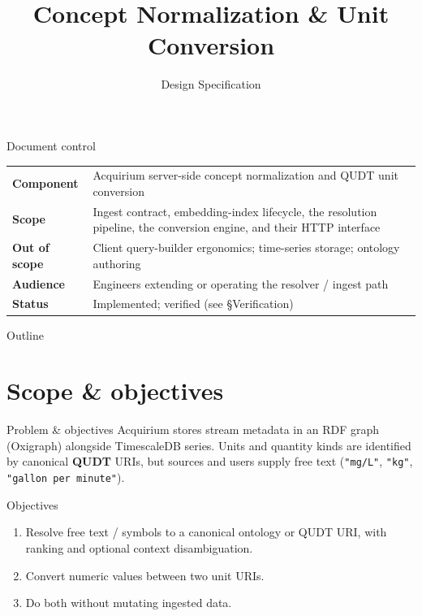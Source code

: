 \documentclass[aspectratio=169]{beamer}
\title[QUDT Normalization]{Concept Normalization \& Unit Conversion}
\subtitle{Design Specification}
\date{}
\newcommand{\code}[1]{\texttt{\small #1}}
\begin{document}
\frame{\titlepage}

\begin{frame}{Document control}
  \small
  \begin{tabular}{@{}p{}p{}@{}}
    \hline
    \textbf{Component} & Acquirium server-side concept normalization and
        QUDT unit conversion \\
    \textbf{Scope} & Ingest contract, embedding-index lifecycle, the
        resolution pipeline, the conversion engine, and their HTTP
        interface \\
    \textbf{Out of scope} & Client query-builder ergonomics; time-series
        storage; ontology authoring \\
    \textbf{Audience} & Engineers extending or operating the resolver /
        ingest path \\
    \textbf{Status} & Implemented; verified (see \S Verification) \\ \hline
  \end{tabular}
\end{frame}

\begin{frame}{Outline}
  \tableofcontents
\end{frame}

\section{Scope \& objectives}

\begin{frame}{Problem \& objectives}
  Acquirium stores stream metadata in an RDF graph (Oxigraph) alongside
  TimescaleDB series. Units and quantity kinds are identified by canonical
  \textbf{QUDT} URIs, but sources and users supply free text
  (\code{"mg/L"}, \code{"kg"}, \code{"gallon per minute"}).

  \begin{block}{Objectives}
    \begin{enumerate}
      \item Resolve free text / symbols to a canonical ontology or QUDT
            URI, with ranking and optional context disambiguation.
      \item Convert numeric values between two unit URIs.
      \item Do both without mutating ingested data.
    \end{enumerate}
  \end{block}
\end{frame}
\end{document}
